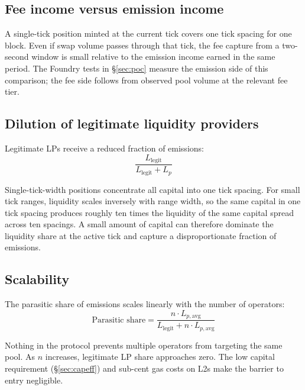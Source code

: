 \documentclass[11pt,a4paper]{article}
\theoremstyle{definition}
\begin{document}
\subsection{Fee income versus emission income}\label{sec:feevemission}

A single-tick position minted at the current tick covers one tick spacing for one block. Even if swap volume passes through that tick, the fee capture from a two-second window is small relative to the emission income earned in the same period. The Foundry tests in \S\ref{sec:poc} measure the emission side of this comparison; the fee side follows from observed pool volume at the relevant fee tier.

\subsection{Dilution of legitimate liquidity providers}\label{sec:dilution}

Legitimate LPs receive a reduced fraction of emissions:
\begin{equation}
\frac{L_{\text{legit}}}{L_{\text{legit}} + L_p}
\end{equation}

Single-tick-width positions concentrate all capital into one tick spacing. For small tick ranges, liquidity scales inversely with range width, so the same capital in one tick spacing produces roughly ten times the liquidity of the same capital spread across ten spacings. A small amount of capital can therefore dominate the liquidity share at the active tick and capture a disproportionate fraction of emissions.

\subsection{Scalability}\label{sec:scale}

The parasitic share of emissions scales linearly with the number of operators:
\begin{equation}
\text{Parasitic share} = \frac{n \cdot L_{p,\text{avg}}}{L_{\text{legit}} + n \cdot L_{p,\text{avg}}}
\end{equation}

Nothing in the protocol prevents multiple operators from targeting the same pool. As $n$ increases, legitimate LP share approaches zero. The low capital requirement (\S\ref{sec:capeff}) and sub-cent gas costs on L2s make the barrier to entry negligible.

\end{document}
